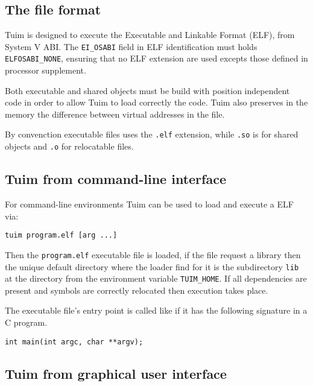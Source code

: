 \documentclass[
   article,                      %
   10pt,                         %
   openright,                    %
   oneside,                      %
   a4paper,                      %
   sumario = tradicional,        %
   english,                      %
   xcolor=table                  %
]{abntex2}
\begin{document}
\subsection{The file format}

Tuim is designed to execute the
Executable and Linkable Format (ELF),
from System V\cite{systemv} ABI.
The \texttt{EI\_OSABI} field in ELF identification
must holds \texttt{ELFOSABI\_NONE},
ensuring that no ELF extension are used excepts those defined in
processor supplement.

Both executable and shared objects must be build
with position independent code in order to allow Tuim
to load correctly the code.
Tuim also preserves in the memory the
difference between virtual addresses in the file.

By convenction executable files uses the \texttt{.elf} extension,
while \texttt{.so} is for shared objects and
\texttt{.o} for relocatable files.

\subsection{Tuim from command-line interface}

For command-line environments Tuim can be used to load and execute
a ELF via:

\begin{lstlisting}[style=bash]
tuim program.elf [arg ...]
\end{lstlisting}

Then the \texttt{program.elf} executable file is loaded,
if the file request a library then the unique default directory
where the loader find for it is
the subdirectory \texttt{lib} at the directory from the
environment variable \texttt{TUIM\_HOME}.
If all dependencies are present and symbols are correctly
relocated then execution takes place.

The executable file's entry point is called like if it has
the following signature in a C program.

\begin{lstlisting}[style=c]
int main(int argc, char **argv);
\end{lstlisting}

\subsection{Tuim from graphical user interface}
\end{document}
